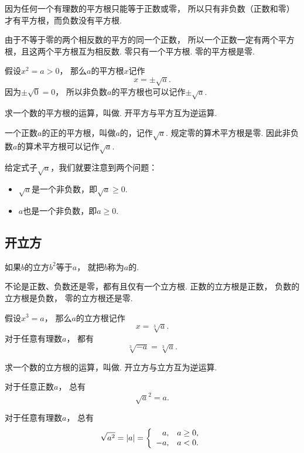 因为任何一个有理数的平方根只能等于正数或零，
所以只有非负数（正数和零）才有平方根，而负数没有平方根.

由于不等于零的两个相反数的平方的同一个正数，
所以一个正数一定有两个平方根，且这两个平方根互为相反数.
零只有一个平方根.
零的平方根是零.

假设\(x^2 = a > 0\)，
那么\(a\)的平方根\(x\)记作\begin{equation*}
	x = \pm \sqrt{a}.
\end{equation*}
因为\(\pm\sqrt0 = 0\)，
所以非负数\(a\)的平方根也可以记作\(\pm\sqrt{a}\).

求一个数的平方根的运算，叫做.
开平方与平方互为逆运算.

一个正数\(a\)的正的平方根，叫做\(a\)的，记作\(\sqrt{a}\).
规定零的算术平方根是零.
因此非负数\(a\)的算术平方根可以记作\(\sqrt{a}\).

给定式子\(\sqrt{a}\)，我们就要注意到两个问题：\begin{itemize}
	\item \(\sqrt{a}\)是一个非负数，即\(\sqrt{a}\geq0\).
	\item \(a\)也是一个非负数，即\(a\geq0\).
\end{itemize}

\subsection{开立方}
如果\(b\)的立方\(b^2\)等于\(a\)，
就把\(b\)称为\(a\)的.

不论是正数、负数还是零，都有且仅有一个立方根.
正数的立方根是正数，
负数的立方根是负数，
零的立方根还是零.

假设\(x^3 = a\)，
那么\(a\)的立方根记作\begin{equation*}
	x = \sqrt[3]{a}.
\end{equation*}
对于任意有理数\(a\)，
都有\begin{equation*}
	\sqrt[3]{-a} = \sqrt[3]{a}.
\end{equation*}

求一个数的立方根的运算，叫做.
开立方与立方互为逆运算.

对于任意正数\(a\)，
总有\begin{equation*}
	\sqrt{a}^2
	= a.
\end{equation*}

对于任意有理数\(a\)，
总有\begin{equation*}
	\sqrt{a^2}
	= \abs{a}
	= \left\{ \begin{array}{rl}
		a, & a\geq0, \\
		-a, & a<0.
	\end{array} \right.
\end{equation*}
